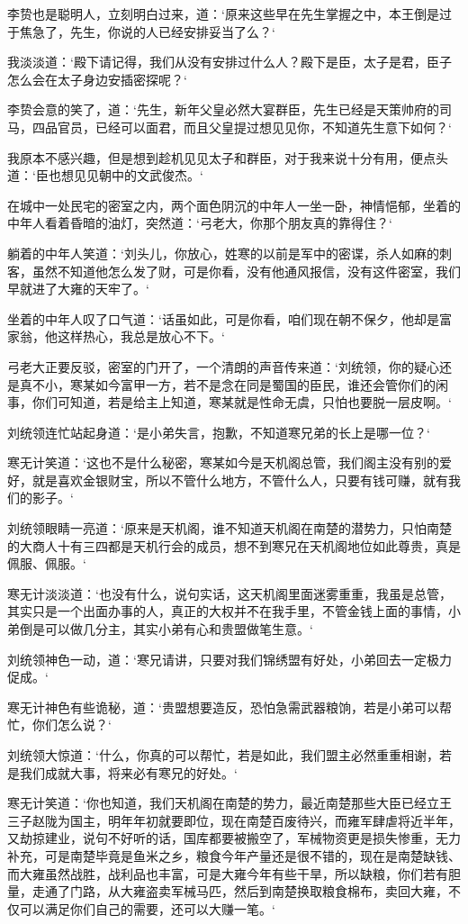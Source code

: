 李贽也是聪明人，立刻明白过来，道：‘原来这些早在先生掌握之中，本王倒是过于焦急了，先生，你说的人已经安排妥当了么？‘

我淡淡道：‘殿下请记得，我们从没有安排过什么人？殿下是臣，太子是君，臣子怎么会在太子身边安插密探呢？‘

李贽会意的笑了，道：‘先生，新年父皇必然大宴群臣，先生已经是天策帅府的司马，四品官员，已经可以面君，而且父皇提过想见见你，不知道先生意下如何？‘

我原本不感兴趣，但是想到趁机见见太子和群臣，对于我来说十分有用，便点头道：‘臣也想见见朝中的文武俊杰。‘

在城中一处民宅的密室之内，两个面色阴沉的中年人一坐一卧，神情悒郁，坐着的中年人看着昏暗的油灯，突然道：‘弓老大，你那个朋友真的靠得住？‘

躺着的中年人笑道：‘刘头儿，你放心，姓寒的以前是军中的密谍，杀人如麻的刺客，虽然不知道他怎么发了财，可是你看，没有他通风报信，没有这件密室，我们早就进了大雍的天牢了。‘

坐着的中年人叹了口气道：‘话虽如此，可是你看，咱们现在朝不保夕，他却是富家翁，他这样热心，我总是放心不下。‘

弓老大正要反驳，密室的门开了，一个清朗的声音传来道：‘刘统领，你的疑心还是真不小，寒某如今富甲一方，若不是念在同是蜀国的臣民，谁还会管你们的闲事，你们可知道，若是给主上知道，寒某就是性命无虞，只怕也要脱一层皮啊。‘

刘统领连忙站起身道：‘是小弟失言，抱歉，不知道寒兄弟的长上是哪一位？‘

寒无计笑道：‘这也不是什么秘密，寒某如今是天机阁总管，我们阁主没有别的爱好，就是喜欢金银财宝，所以不管什么地方，不管什么人，只要有钱可赚，就有我们的影子。‘

刘统领眼睛一亮道：‘原来是天机阁，谁不知道天机阁在南楚的潜势力，只怕南楚的大商人十有三四都是天机行会的成员，想不到寒兄在天机阁地位如此尊贵，真是佩服、佩服。‘

寒无计淡淡道：‘也没有什么，说句实话，这天机阁里面迷雾重重，我虽是总管，其实只是一个出面办事的人，真正的大权并不在我手里，不管金钱上面的事情，小弟倒是可以做几分主，其实小弟有心和贵盟做笔生意。‘

刘统领神色一动，道：‘寒兄请讲，只要对我们锦绣盟有好处，小弟回去一定极力促成。‘

寒无计神色有些诡秘，道：‘贵盟想要造反，恐怕急需武器粮饷，若是小弟可以帮忙，你们怎么说？‘

刘统领大惊道：‘什么，你真的可以帮忙，若是如此，我们盟主必然重重相谢，若是我们成就大事，将来必有寒兄的好处。‘

寒无计笑道：‘你也知道，我们天机阁在南楚的势力，最近南楚那些大臣已经立王三子赵陇为国主，明年年初就要即位，现在南楚百废待兴，而雍军肆虐将近半年，又劫掠建业，说句不好听的话，国库都要被搬空了，军械物资更是损失惨重，无力补充，可是南楚毕竟是鱼米之乡，粮食今年产量还是很不错的，现在是南楚缺钱、而大雍虽然战胜，战利品也丰富，可是大雍今年有些干旱，所以缺粮，你们若有胆量，走通了门路，从大雍盗卖军械马匹，然后到南楚换取粮食棉布，卖回大雍，不仅可以满足你们自己的需要，还可以大赚一笔。‘

